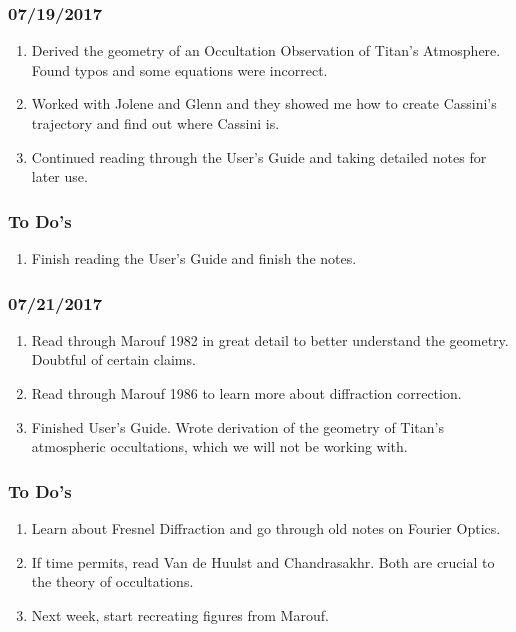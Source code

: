 \documentclass[crop=false,class=book]{standalone}
\begin{document}
\subsubsection{\footnotesize 07/19/2017}
\begin{enumerate}
    \item Derived the geometry of an Occultation Observation of Titan's Atmosphere. Found typos and some equations were incorrect.
    \item Worked with Jolene and Glenn and they showed me how to create Cassini's trajectory and find out where Cassini is.
    \item Continued reading through the User's Guide and taking detailed notes for later use.
\end{enumerate}
\subsubsection{\scriptsize To Do's}
\begin{enumerate}
    \item Finish reading the User's Guide and finish the notes.
\end{enumerate}
\subsubsection{\footnotesize 07/21/2017}
\begin{enumerate}
    \item Read through Marouf 1982 in great detail to better understand the geometry. Doubtful of certain claims.
    \item Read through Marouf 1986 to learn more about diffraction correction.
    \item Finished User's Guide. Wrote derivation of the geometry of Titan's atmospheric occultations, which we will not be working with.
\end{enumerate}
\subsubsection{\scriptsize To Do's}
\begin{enumerate}
    \item Learn about Fresnel Diffraction and go through old notes on Fourier Optics.
    \item If time permits, read Van de Huulst and Chandrasakhr. Both are crucial to the theory of occultations.
    \item Next week, start recreating figures from Marouf.
\end{enumerate}
\end{document}
